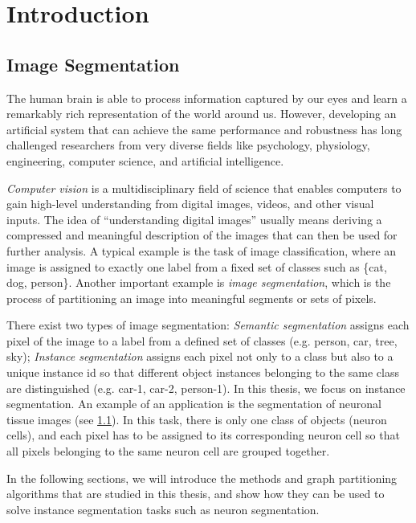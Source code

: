 
\chapter{Introduction}

\section{Image Segmentation}
The human brain is able to process information captured by our eyes and learn a remarkably rich representation of the world around us. However, developing an artificial system that can achieve the same performance and robustness has long challenged researchers from very diverse fields like psychology, physiology, engineering, computer science, and artificial intelligence.

\emph{Computer vision} is a multidisciplinary field of science that enables computers to gain high-level understanding from digital images, videos, and other visual inputs. 
The idea of ``understanding digital images'' usually means deriving a compressed and meaningful description of the images that can then be used for further analysis.
A typical example is the task of image classification, where an image is assigned to exactly one label from a fixed set of classes such as \{cat, dog, person\}. 
Another important example is \emph{image segmentation}, which is the process of partitioning an image into meaningful segments or sets of pixels. 

There exist two types of image segmentation: \emph{Semantic segmentation} assigns each pixel of the image to a label from a defined set of classes (e.g. person, car, tree, sky); \emph{Instance segmentation} assigns each pixel not only to a class but also to a unique instance id so that different object instances belonging to the same class are distinguished (e.g. car-1, car-2, person-1). 
In this thesis, we focus on instance segmentation. An example of an application is the segmentation of neuronal tissue images (see  \ref{}). In this task, there is only one class of objects (neuron cells), and each pixel has to be assigned to its corresponding neuron cell so that all pixels belonging to the same neuron cell are grouped together. 

In the following sections, we will introduce the methods and graph partitioning algorithms that are studied in this thesis, and show how they can be used to solve instance segmentation tasks such as neuron segmentation.


